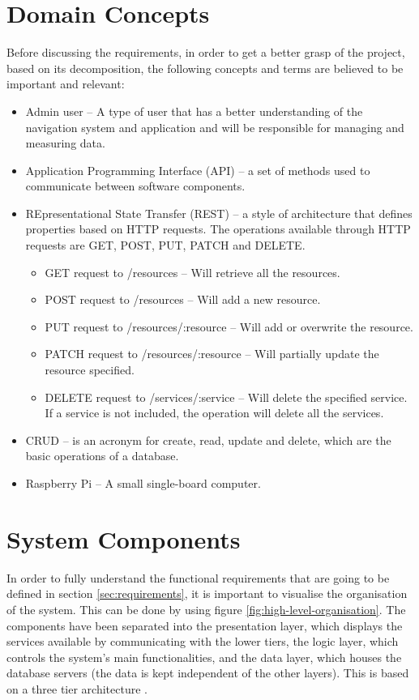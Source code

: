 \section{Domain Concepts}
\label{sec:domain-concepts}
Before discussing the requirements, in order to get a better grasp of the project, based on its decomposition, the following concepts and terms are believed to be important and relevant:
\begin{itemize}
    \item Admin user – A type of user that has a better understanding of the navigation system and application and will be responsible for managing and measuring data.
    \item Application Programming Interface (API) – a set of methods used to communicate between software components.
    \item REpresentational State Transfer (REST) – a style of architecture that defines properties based on HTTP requests. The operations available through HTTP requests are GET, POST, PUT, PATCH and DELETE.
        \begin{itemize}
            \item GET request to /resources – Will retrieve all the resources.
            \item POST request to /resources – Will add a new resource.
            \item PUT request to /resources/:resource – Will add or overwrite the resource.
            \item PATCH request to /resources/:resource – Will partially update the resource specified.
            \item DELETE request to /services/:service – Will delete the specified service. If a service is not included, the operation will delete all the services.
        \end{itemize}
    \item CRUD – is an acronym for create, read, update and delete, which are the basic operations of a database.
    \item Raspberry Pi – A small single-board computer.
\end{itemize}
\newpage

\section{System Components}
In order to fully understand the functional requirements that are going to be defined in section \ref{sec:requirements}, it is important to visualise the organisation of the system. This can be done by using figure \ref{fig:high-level-organisation}. The components have been separated into the presentation layer, which displays the services available by communicating with the lower tiers, the logic layer, which controls the system's main functionalities, and the data layer, which houses the database servers (the data is kept independent of the other layers). This is based on a three tier architecture \cite{three-tier}.

